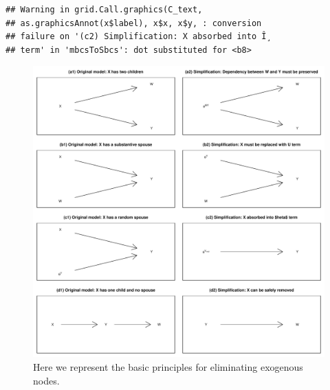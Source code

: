 \documentclass[
  12pt,
]{book}
\begin{document}
\begin{verbatim}
## Warning in grid.Call.graphics(C_text,
## as.graphicsAnnot(x$label), x$x, x$y, : conversion
## failure on '(c2) Simplification: X absorbed into Î¸
## term' in 'mbcsToSbcs': dot substituted for <b8>
\end{verbatim}

\begin{figure}

{\centering \includegraphics[width=.5\textwidth]{ii_files/figure-latex/elimrules-1} 

}

\caption{Here we represent the basic principles for eliminating exogenous nodes.}\label{fig:elimrules}
\end{figure}
\end{document}
